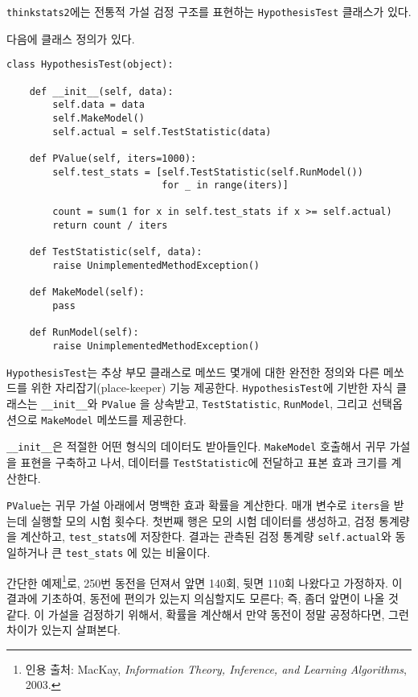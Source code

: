 {\tt thinkstats2}에는 전통적 가설 검정 구조를 표현하는 {\tt HypothesisTest} 클래스가 있다.

다음에 클래스 정의가 있다.

\begin{verbatim}
class HypothesisTest(object):

    def __init__(self, data):
        self.data = data
        self.MakeModel()
        self.actual = self.TestStatistic(data)

    def PValue(self, iters=1000):
        self.test_stats = [self.TestStatistic(self.RunModel()) 
                           for _ in range(iters)]

        count = sum(1 for x in self.test_stats if x >= self.actual)
        return count / iters

    def TestStatistic(self, data):
        raise UnimplementedMethodException()

    def MakeModel(self):
        pass

    def RunModel(self):
        raise UnimplementedMethodException()
\end{verbatim}

{\tt HypothesisTest}는 추상 부모 클래스로 메쏘드 몇개에 대한 완전한 정의와 
다른 메쏘드를 위한 자리잡기(place-keeper) 기능 제공한다.
{\tt HypothesisTest}에 기반한 자식 클래스는 \verb"__init__"와 {\tt PValue} 을 상속받고, {\tt TestStatistic}, {\tt RunModel}, 그리고 선택옵션으로 {\tt MakeModel} 메쏘드를 제공한다.

\verb"__init__"은 적절한 어떤 형식의 데이터도 받아들인다.
{\tt MakeModel} 호출해서 귀무 가설을 표현을 구축하고 나서,
데이터를 {\tt TestStatistic}에 전달하고 표본 효과 크기를 계산한다.


{\tt PValue}는 귀무 가설 아래에서 명백한 효과 확률을 계산한다.
매개 변수로 {\tt iters}을 받는데 실행할 모의 시험 횟수다.
첫번째 행은 모의 시험 데이터를 생성하고, 검정 통계량을 계산하고, 
\verb"test_stats"에 저장한다.
결과는 관측된 검정 통계량 {\tt self.actual}와 동일하거나 큰 \verb"test_stats" 에 있는 비율이다.

간단한 예제\footnote{인용 출처: MacKay, {\it Information
Theory, Inference, and Learning Algorithms}, 2003.}로, 250번 동전을 던져서 앞면 140회, 뒷면 110회 나왔다고 가정하자.
이 결과에 기초하여, 동전에 편의가 있는지 의심할지도 모른다; 즉, 좀더 앞면이 나올 것 같다.
이 가설을 검정하기 위해서, 확률을 계산해서 만약 동전이 정말 공정하다면, 그런 차이가 있는지 살펴본다.

